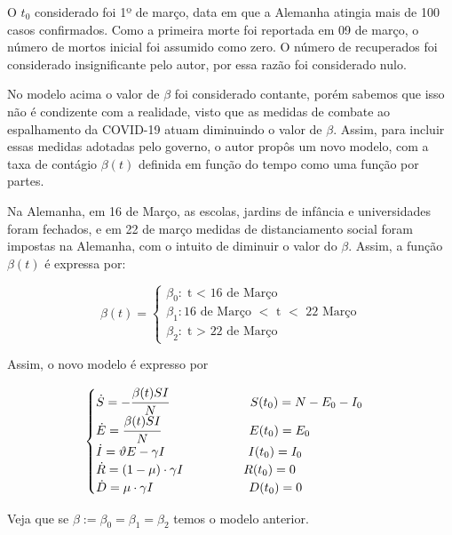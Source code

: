 \documentclass[12pt]{article}
\begin{document}
O $t_0$ considerado foi 1º de março, data em que a Alemanha atingia mais de 100 casos confirmados. Como a primeira morte foi reportada em 09 de março, o número de mortos inicial foi assumido como zero. O número de recuperados foi considerado insignificante pelo autor, por essa razão foi considerado nulo. 

No modelo acima o valor de $\beta$ foi considerado contante, porém sabemos que isso não é condizente com a realidade, visto que as medidas de combate ao espalhamento da COVID-19 atuam diminuindo o valor de $\beta$. Assim, para incluir essas medidas adotadas pelo governo, o autor propôs um novo modelo, com a taxa de contágio $\beta (t)$ definida em função do tempo como uma função por partes. 

Na Alemanha, em 16 de Março, as escolas, jardins de infância e universidades foram fechados, e em 22 de março medidas de distanciamento social foram impostas na Alemanha, com o intuito de diminuir o valor do $\beta$. Assim, a função $\beta(t)$ é expressa por:
\begin{center}
$$
\beta(t) = 
\begin{cases}
\beta_0 : \text{t $<$ 16 de Março} \\
\beta_1 : \text{16 de Março $<$ t $<$ 22 Março} \\
\beta_2 : \text{t $>$ 22 de Março}
\end{cases}
$$
\end{center}

Assim, o novo modelo é expresso por

\begin{center}
$$
\begin{cases}
\dot S = -\cfrac{\beta (t) S I}{N} \hspace{2.3cm} S(t_0)= N - E_0 - I_0\\
\dot E = \cfrac{\beta (t) S I}{N} \hspace{2.5cm} E(t_0) = E_0\\
\dot I = \vartheta E - \gamma I \hspace{2.35cm} I(t_0) = I_0\\
\dot R = (1- \mu) \cdot \gamma I\hspace{1.7cm} R(t_0) = 0 \\
\dot D = \mu \cdot \gamma I \hspace{2.7cm}  D(t_0) = 0
\end{cases}
$$
\end{center}

\noindent Veja que se $\beta := \beta_0 = \beta_1 = \beta_2$ temos o modelo anterior.
\end{document}
